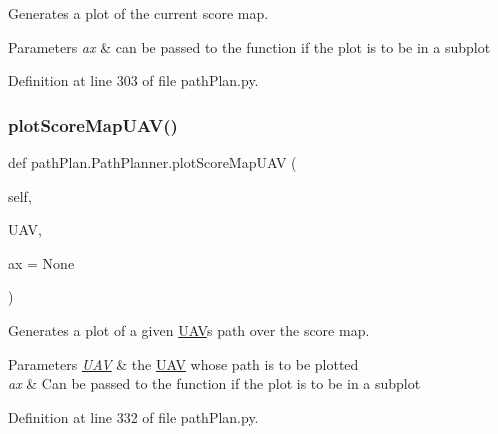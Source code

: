 Generates a plot of the current score map. 


\begin{DoxyParams}{Parameters}
{\em ax} & can be passed to the function if the plot is to be in a subplot \\
\hline
\end{DoxyParams}


Definition at line 303 of file path\+Plan.\+py.

\mbox{\label{classpath_plan_1_1_path_planner_aa5506bc585bd5f1d3fa76d0e383b0cc2}} 
\subsubsection{\texorpdfstring{plot\+Score\+Map\+U\+A\+V()}{plotScoreMapUAV()}}
{\footnotesize\ttfamily def path\+Plan.\+Path\+Planner.\+plot\+Score\+Map\+U\+AV (\begin{DoxyParamCaption}\item[{}]{self,  }\item[{}]{U\+AV,  }\item[{}]{ax = {\ttfamily None} }\end{DoxyParamCaption})}



Generates a plot of a given \mbox{\hyperlink{classpath_plan_1_1_u_a_v}{U\+AV}}\textquotesingle{}s path over the score map. 


\begin{DoxyParams}{Parameters}
{\em \mbox{\hyperlink{classpath_plan_1_1_u_a_v}{U\+AV}}} & the \mbox{\hyperlink{classpath_plan_1_1_u_a_v}{U\+AV}} whose path is to be plotted \\
\hline
{\em ax} & Can be passed to the function if the plot is to be in a subplot \\
\hline
\end{DoxyParams}


Definition at line 332 of file path\+Plan.\+py.

\mbox{\label{classpath_plan_1_1_path_planner_a6e74d35801d637631580333ea9210aa5}} 
